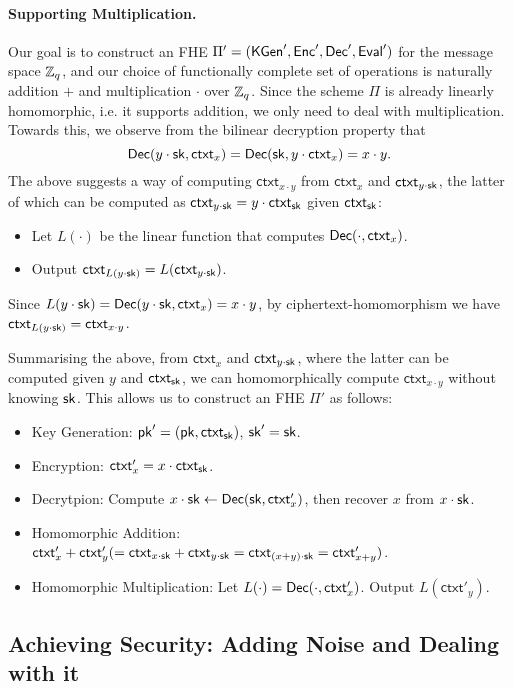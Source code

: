\documentclass[10pt,twoside]{article}
\newcommand{\ctxt}{\mathsf{ctxt}}
\begin{document}
\paragraph{Supporting Multiplication.}

Our goal is to construct an FHE $\Pi' = (\mathsf{KGen}', \mathsf{Enc}', \mathsf{Dec}', \mathsf{Eval}')$ for the message space $\mathbb{Z}_q$, and our choice of functionally complete set of operations is naturally addition $+$ and multiplication $\cdot$ over $\mathbb{Z}_q$.
Since the scheme $\Pi$ is already linearly homomorphic, i.e. it supports addition, we only need to deal with multiplication.
Towards this, we observe from the bilinear decryption property that
\[\dec(y \cdot \sk, \ctxt_x) = \dec(\sk, y \cdot \ctxt_x) = x \cdot y.\]
The above suggests a way of computing $\ctxt_{x \cdot y}$ from $\ctxt_x$ and $\ctxt_{y \cdot \sk}$, the latter of which can be computed as $\ctxt_{y \cdot \sk} = y \cdot \ctxt_\sk$ given $\ctxt_{\sk}$:
\begin{itemize}
    \item Let $L(\cdot)$ be the linear function that computes $\dec(\cdot, \ctxt_x)$.
    \item Output $\ctxt_{L(y \cdot \sk)} = L(\ctxt_{y \cdot \sk})$.
\end{itemize}
Since $L(y \cdot \sk) = \dec(y \cdot \sk, \ctxt_x) = x \cdot y$, by ciphertext-homomorphism we have $\ctxt_{L(y \cdot \sk)} = \ctxt_{x \cdot y}$.

Summarising the above, from $\ctxt_x$ and $\ctxt_{y \cdot \sk}$, where the latter can be computed given $y$ and $\ctxt_{\sk}$, we can homomorphically compute $\ctxt_{x \cdot y}$ without knowing $\sk$. This allows us to construct an FHE $\Pi'$ as follows:
\begin{itemize}
    \item Key Generation: $\pk' = (\pk, \ctxt_\sk)$, $\sk' = \sk$.
    \item Encryption: $\ctxt'_x = x \cdot \ctxt_\sk$.
    \item Decrytpion: Compute $x \cdot \sk \gets \dec(\sk, \ctxt'_x)$, then recover $x$ from $x \cdot \sk$.
    \item Homomorphic Addition: $\ctxt'_x + \ctxt'_y (= \ctxt_{x \cdot \sk} + \ctxt_{y \cdot \sk} = \ctxt_{(x+y) \cdot \sk} = \ctxt'_{x+y})$.
    \item Homomorphic Multiplication: Let $L(\cdot) = \dec(\cdot, \ctxt'_x)$. Output $L(\ctxt'_y)$.
\end{itemize}

\subsection{Achieving Security: Adding Noise and Dealing with it}
\end{document}
